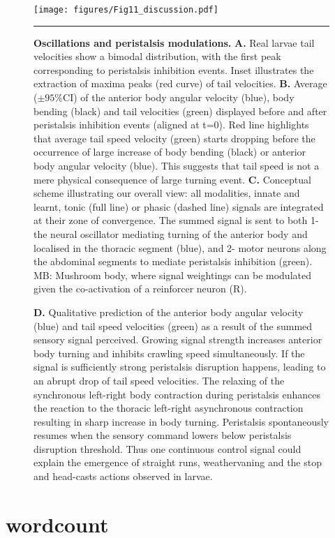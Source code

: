 \documentclass[11pt,a4paper]{article}
\begin{document}
\begin{figure}
\begin{center}
\texttt{[image: figures/Fig11\_discussion.pdf]}
\caption{{\bf Oscillations and peristalsis modulations.} {\bf A.} Real larvae tail velocities show a bimodal distribution, with the first peak corresponding to peristalsis inhibition events. Inset illustrates the extraction of maxima peaks (red curve) of tail velocities.
{\bf B.} Average ($\pm 95\%$CI) of the anterior body angular velocity (blue), body bending (black) and tail velocities (green) displayed before and after peristalsis inhibition events (aligned at t=0). Red line highlights that average tail speed velocity (green) starts dropping before the occurrence of large increase of body bending (black) or anterior body angular velocity (blue). This suggests that tail speed is not a mere physical consequence of large turning event.
{\bf C.} Conceptual scheme illustrating our overall view: all modalities, innate and learnt, tonic (full line) or phasic (dashed line) signals are integrated at their zone of convergence. The summed signal is sent to both 1-the neural oscillator mediating turning of the anterior body and localised in the thoracic segment (blue), and 2- motor neurons along the abdominal segments to mediate peristalsis inhibition (green). MB: Mushroom body, where signal weightings can be modulated given the co-activation of a reinforcer neuron (R).
\label{fig:Peristalsis}}
\hrule
\end{center}
\end{figure}



\begin{figure}
\ContinuedFloat
\caption{
{\bf D.} Qualitative prediction of the anterior body angular velocity (blue) and tail speed velocities (green) as a result of the summed sensory signal perceived. Growing signal strength increases anterior body turning and inhibits crawling speed simultaneously. If the signal is sufficiently strong peristalsis disruption happens, leading to an abrupt drop of tail speed velocities. The relaxing of the synchronous left-right body contraction during peristalsis enhances the reaction to the thoracic left-right asynchronous contraction resulting in sharp increase in body turning. Peristalsis spontaneously resumes when the sensory command lowers below peristalsis disruption threshold. Thus one continuous control signal could explain the emergence of straight runs, weathervaning and the stop and head-casts actions observed in larvae.
}
\end{figure}





\clearpage



%
\section*{wordcount}
\newcommand\wordcount{ }
\wordcount
\end{document}
